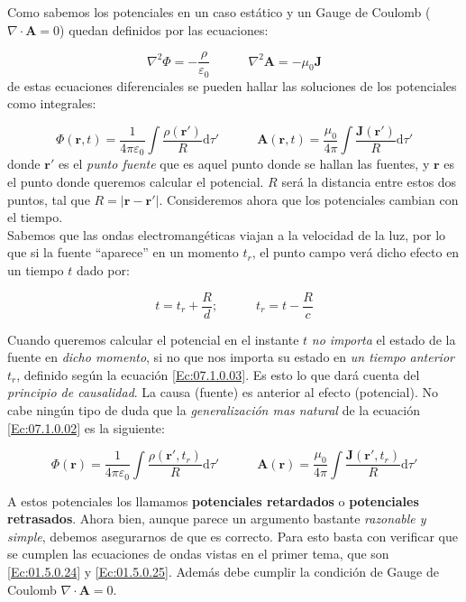 \documentclass[12pt,a4paper]{article}
\newcommand{\D}{\mathrm{d}}
\newcommand{\tquad}{\quad \quad \quad}
\newcommand{\dive}{\nabla \cdot}
\newcommand{\Jn}{\mathbf{J}}
\newcommand{\rn}{\mathbf{r}}
\newcommand{\An}{\mathbf{A}}
\numberwithin{equation}{section}
\numberwithin{figure}{section}
\begin{document}
Como sabemos los potenciales en un caso estático y un Gauge de Coulomb ($\nabla \cdot \An = 0$) quedan definidos por las ecuaciones:

\begin{equation}
\nabla^2 \Phi =  - \dfrac{\rho}{\varepsilon_0} \tquad \nabla^2 \An = - \mu_0 \Jn
\end{equation} 
de estas ecuaciones diferenciales se pueden hallar las soluciones de los potenciales como integrales:

\begin{equation}
\Phi (\rn,t) = \dfrac{1}{4 \pi \varepsilon_0} \int \dfrac{\rho(\rn')}{R} \D \tau' \tquad \An (\rn,t) = \dfrac{\mu_0}{4 \pi} \int \dfrac{\Jn (\rn')}{R} \D \tau'  \label{Ec:07.1.0.02}
\end{equation}
donde $\rn'$ es el \textit{punto fuente} que es aquel punto donde se hallan las fuentes, y $\rn$ es el punto donde queremos calcular el potencial. $R$ será la distancia entre estos dos puntos, tal que $R = |\rn - \rn'|$. Consideremos ahora que los potenciales cambian con el tiempo. \\

Sabemos que las ondas electromangéticas viajan a la velocidad de la luz, por lo que si la fuente ``aparece'' en un momento $t_r$, el punto campo verá dicho efecto en un tiempo $t$ dado por:

\begin{equation}
t = t_r + \dfrac{R}{d}; \tquad t_r = t - \dfrac{R}{c} \label{Ec:07.1.0.03}
\end{equation}

Cuando queremos calcular el potencial en el instante $t$ \textit{no importa} el estado de la fuente en \textit{dicho momento}, si no que nos importa su estado en \textit{un tiempo anterior} $t_r$, definido según la ecuación \ref{Ec:07.1.0.03}. Es esto lo que dará cuenta del \textit{principio de causalidad}. La causa (fuente) es anterior al efecto (potencial). No cabe ningún tipo de duda que la \textit{generalización mas natural} de la ecuación \ref{Ec:07.1.0.02} es la siguiente:

\begin{equation}
\Phi (\rn) = \dfrac{1}{4 \pi \varepsilon_0} \int \dfrac{\rho(\rn',t_r)}{R} \D \tau' \tquad \An (\rn) = \dfrac{\mu_0}{4 \pi} \int \dfrac{\Jn (\rn',t_r)}{R} \D \tau'  \label{Ec:07.1.0.04}
\end{equation}

A estos potenciales los llamamos \textbf{potenciales retardados} o \textbf{potenciales retrasados}. Ahora bien, aunque parece un argumento bastante \textit{razonable y simple}, debemos asegurarnos de que es correcto. Para esto basta con verificar que se cumplen las ecuaciones de ondas vistas en el primer tema, que son \ref{Ec:01.5.0.24} y \ref{Ec:01.5.0.25}. Además debe cumplir la condición de Gauge de Coulomb $\dive \An = 0 $. 
\end{document}
